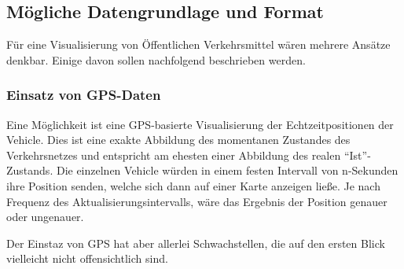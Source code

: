 \subsection{Mögliche Datengrundlage und Format}
\label{sub:mögliche_datengrundlage_und_format}
  Für eine Visualisierung von Öffentlichen Verkehrsmittel wären mehrere Ansätze denkbar. Einige davon sollen nachfolgend beschrieben werden.

  \subsubsection{Einsatz von GPS-Daten}
  \label{ssub:einsatz_von_gps_daten}
    Eine Möglichkeit ist eine GPS-basierte Visualisierung der Echtzeitpositionen der Vehicle. Dies ist eine exakte Abbildung des momentanen Zustandes des Verkehrsnetzes und entspricht am ehesten einer Abbildung des realen "`Ist"'-Zustands. Die einzelnen Vehicle würden in einem festen Intervall von n-Sekunden ihre Position senden, welche sich dann auf einer Karte anzeigen ließe. Je nach Frequenz des Aktualisierungsintervalls, wäre das Ergebnis der Position genauer oder ungenauer.

    Der Einstaz von GPS hat aber allerlei Schwachstellen, die auf den ersten Blick vielleicht nicht offensichtlich sind.

